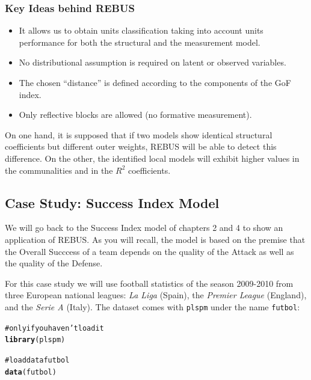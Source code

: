 \documentclass[12pt]{book}\usepackage{graphicx, color}
\makeatletter
\newcommand{\hlfunctioncall}[1]{\textcolor[rgb]{0.501960784313725,0,0.329411764705882}{\textbf{#1}}}%
\newcommand{\hlcomment}[1]{\textcolor[rgb]{0.180392156862745,0.6,0.341176470588235}{#1}}%
\newenvironment{kframe}{%
 \def\at@end@of@kframe{}%
 \ifinner\ifhmode%
  \def\at@end@of@kframe{\end{minipage}}%
  \begin{minipage}{\columnwidth}%
 \fi\fi%
 \def\FrameCommand##1{\hskip\@totalleftmargin \hskip-\fboxsep
 \colorbox{shadecolor}{##1}\hskip-\fboxsep
     \hskip-\linewidth \hskip-\@totalleftmargin \hskip\columnwidth}%
 \MakeFramed {\advance\hsize-\width
   \@totalleftmargin\z@ \linewidth\hsize
   \@setminipage}}%
 {\par\unskip\endMakeFramed%
 \at@end@of@kframe}
\newenvironment{knitrout}{}{} %
\newcommand{\plspm}{\texttt{plspm}}
\newcommand{\code}[1]{\texttt{#1}}
\makeatother
\begin{document}
\subsubsection*{Key Ideas behind REBUS}

\begin{itemize}
 \item It allows us to obtain units classification taking into account units performance for both the structural and the measurement model.
 \item No distributional assumption is required on latent or observed variables.
 \item The chosen ``distance'' is defined according to the components of the GoF index.
 \item Only reflective blocks are allowed (no formative measurement).
\end{itemize}

On one hand, it is supposed that if two models show identical structural coefficients but different outer weights, REBUS will be able to detect this difference. On the other, the identified local models will exhibit higher values in the communalities and in the $R^2$ coefficients.



\subsection{Case Study: Success Index Model}
We will go back to the Success Index model of chapters 2 and 4 to show an application of REBUS. As you will recall, the model is based on the premise that the Overall Succcess of a team depends on the quality of the Attack as well as the quality of the Defense. 

For this case study we will use football statistics of the season 2009-2010 from three European national leagues: \textit{La Liga} (Spain), the \textit{Premier League} (England), and the \textit{Serie A} (Italy). The dataset comes with \plspm{} under the name \code{futbol}:
\begin{knitrout}
\color{fgcolor}\begin{kframe}
\begin{alltt}
\hlcomment{# only if you haven't load it}
\hlfunctioncall{library}(plspm)

\hlcomment{# load data futbol}
\hlfunctioncall{data}(futbol)
\end{alltt}
\end{kframe}
\end{knitrout}
\end{document}

